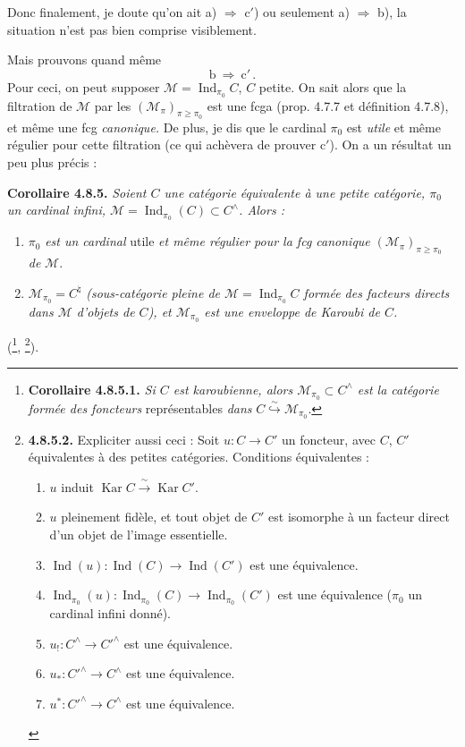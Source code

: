 \documentclass[11pt]{article}
\newcommand{\msp}[1]{\marginpar{\footnotesize [#1]}}
\newcommand{\Ind}{\operatorname{Ind}}
\newcommand{\Kar}{\operatorname{Kar}}
\begin{document}
Donc finalement, je doute qu'on ait a) $\Longrightarrow$ c$'$) ou seulement a) $\Longrightarrow$ b), la situation n'est pas bien comprise visiblement.

Mais prouvons quand même
\[
\mathrm{b} \ \Longrightarrow \ \mathrm{c}' \, .
\]
Pour ceci, on peut supposer $\mathcal{M}=\Ind_{\pi_0}C$, $C$ petite. On sait alors que la filtration de $\mathcal{M}$ par les $(\mathcal{M}_\pi)_{\pi\geqslant\pi_0}$ est une fcga (prop. 4.7.7 et définition 4.7.8), et même une fcg \textit{canonique.} De plus, je dis que le cardinal $\pi_0$ est \textit{utile} et même régulier pour cette filtration (ce qui achèvera de prouver c$'$). On a un résultat un peu plus précis :

\msp{page 201}
\textbf{Corollaire 4.8.5.} \textit{Soient $C$ une catégorie équivalente à une petite catégorie, $\pi_0$ un cardinal infini, $\mathcal{M}=\Ind_{\pi_0}(C)\subset C^\wedge$. Alors :}
\begin{enumerate}
\item[\textit{1$^\circ$)}] $\pi_0$ \textit{est un cardinal} utile \textit{et même régulier pour la fcg canonique} $(\mathcal{M}_\pi)_{\pi\geqslant\pi_0}$ \textit{de} $\mathcal{M}$.
\item[\textit{2$^\circ$)}] $\mathcal{M}_{\pi_0}=C^\natural$ \textit{(sous-catégorie pleine de $\mathcal{M}=\Ind_{\pi_0}C$ formée des facteurs directs dans $\mathcal{M}$ d'objets de $C$), et $\mathcal{M}_{\pi_0}$ est une enveloppe de Karoubi de $C$.}
\end{enumerate}
(\footnote{\textbf{Corollaire 4.8.5.1.} \textit{Si $C$ est karoubienne, alors $\mathcal{M}_{\pi_0}\subset C^\wedge$ est la catégorie formée des foncteurs} représentables \textit{dans} $C\overset{\sim}{\hookrightarrow}\mathcal{M}_{\pi_0}$.}, \footnote{\textbf{4.8.5.2.} Expliciter aussi ceci : Soit $u : C\longrightarrow C'$ un foncteur, avec $C$, $C'$ équivalentes à des petites catégories. Conditions équivalentes :
\begin{enumerate}
\item[a)] $u$ induit $\Kar C\xrightarrow{\ \sim\ }\Kar C'$.
\item[a$'$)] $u$ pleinement fidèle, et tout objet de $C'$ est isomorphe à un facteur direct d'un objet de l'image essentielle.
\item[b)] $\Ind(u) : \Ind(C)\longrightarrow\Ind(C')$ est une équivalence.
\item[c)] $\Ind_{\pi_0}(u) : \Ind_{\pi_0}(C)\longrightarrow\Ind_{\pi_0}(C')$ est une équivalence ($\pi_0$ un cardinal infini donné).
\item[d)] $u_! : C^\wedge\longrightarrow C'^\wedge$ est une équivalence.
\item[d$'$)] $u_* : C'^\wedge\longrightarrow C^\wedge$ est une équivalence.
\item[d$''$)] $u^* : C'^\wedge\longrightarrow C^\wedge$ est une équivalence.
\end{enumerate}}).
\end{document}
